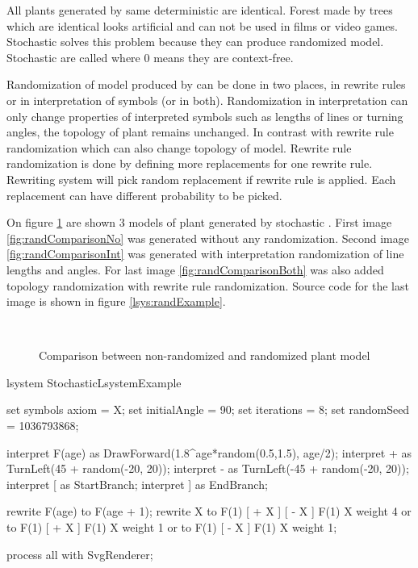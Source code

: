 All plants generated by same deterministic \lsystem are identical.
Forest made by trees which are identical looks artificial and can not be used in films or video games.
Stochastic \lsystems solves this problem because they can produce randomized model.
Stochastic \lsystems are called \zerolsystem where 0 means they are context-free.

Randomization of model produced by \lsystem can be done in two places, in rewrite rules or in interpretation of symbols (or in both).
Randomization in interpretation can only change properties of interpreted symbols such as lengths of lines or turning angles, the topology of plant remains unchanged.
In contrast with rewrite rule randomization which can also change topology of model.
Rewrite rule randomization is done by defining more replacements for one rewrite rule.
Rewriting system will pick random replacement if rewrite rule is applied.
Each replacement can have different probability to be picked.

On figure \ref{fig:randComparison} are shown 3 models of plant generated by stochastic \lsystems.
First image \ref{fig:randComparisonNo} was generated without any randomization.
Second image \ref{fig:randComparisonInt} was generated with interpretation randomization of line lengths and angles.
For last image \ref{fig:randComparisonBoth} was also added topology randomization with rewrite rule randomization.
Source code for the last image is shown in figure \ref{lsys:randExample}.

\begin{figure}[ht]
	\centering
	 ~
	 ~
	\caption{Comparison between non-randomized and randomized plant model}
	\label{fig:randComparison}
\end{figure}

\begin{Lsystem}[label=lsys:randExample,caption={Example of stochastic \lsystem with randomized rewrite rules and interpretation}]
lsystem StochasticLsystemExample {
	set symbols axiom = X;
	set initialAngle = 90;
	set iterations = 8;
	set randomSeed = 1036793868;

	interpret F(age) as DrawForward(1.8^age*random(0.5,1.5), age/2);
	interpret + as TurnLeft(45 + random(-20, 20));
	interpret - as TurnLeft(-45 + random(-20, 20));
	interpret [ as StartBranch;
	interpret ] as EndBranch;

	rewrite F(age) to F(age + 1);
	rewrite X
		to F(1) [ + X ] [ - X ] F(1) X  weight 4 or
		to F(1) [ + X ]         F(1) X  weight 1 or
		to F(1)         [ - X ] F(1) X  weight 1;
}
process all with SvgRenderer;
\end{Lsystem}


